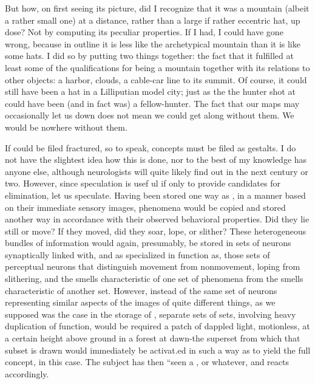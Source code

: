 But how, on first seeing its picture, did I recognize that it was a mountain (albeit a rather small one) at a distance, rather than a large if rather eccentric hat, up dose? Not by computing its peculiar proper\-ties. If I had, I could have gone wrong, because in outline it is less like the archetypical mountain than it is like some hats. I did so by putting two things together: the fact that it fulfilled at least some of the qualifications for being a mountain together with its relations to other objects: a harbor, clouds, a cable-car line to its summit. Of course, it could still have been a hat in a Lilliputian model city; just as the  the hunter shot at could have been (and in fact was) a
fellow-hunter. The fact that our maps may occasionally let us down does not mean we could get along without them. We would be no\-where without them.

If  could be filed fractured, so to speak, concepts must
be filed as gestalts. I do not have the slightest idea how this is done, nor to the best of my knowledge has anyone else, although neurologists will quite likely find out in the next century or two. However, since speculation is usef ul if only to provide candidates for elimination, let us speculate. Having been stored one way as , in a manner based on their immediate sensory images, phenomena would be copied and stored another way in accordance with their observed behavioral properties. Did they lie still or move? If they moved, did they soar, lope, or slither? These heterogeneous bundles of information would again, presumably, be stored in sets of neurons synaptically linked with, and as specialized in function as, those sets of perceptual neurons that distinguish movement from nonmovement, loping from slithering, and the smells characteristic of one set of phenomena from the smells characteristic of another set. However, instead of the same set of neurons representing similar aspects of the images of quite different things, as we supposed was the case in the storage of , separate
sets of sets, involving heavy duplication of function, would be required
a patch of dappled light, motionless, at a certain height above ground in a forest at dawn{}-the superset from which that subset is drawn would immediately be activat.ed in such a way as to yield the full concept\-\textit{,} in this case. The subject has then ``seen a , or whatever, and reacts accordingly.

